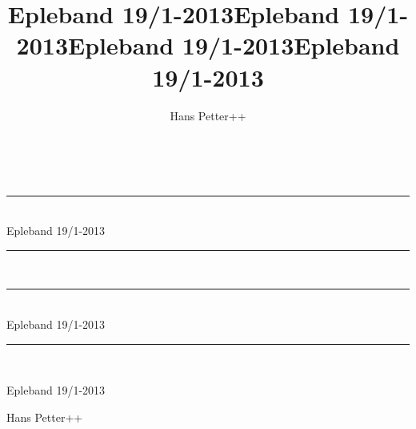\documentclass[%
twoside,                 %
draft,                   %
final,                   %
10pt]{article}
\begin{document}







\title{{\color{seccolor} Epleband 19/1-2013}}
\title{Epleband 19/1-2013}


\thispagestyle{empty}
\hbox{\ \ }
\vfill
\begin{center}
{\huge{\bfseries{
\begin{spacing}{1.25}
{\color{seccolor}\rule{\linewidth}{0.5mm}} \\[0.4cm]
{\color{seccolor}Epleband 19/1-2013}
\\[0.4cm] {\color{seccolor}\rule{\linewidth}{0.5mm}} \\[1.5cm]
{\rule{\linewidth}{0.5mm}} \\[0.4cm]
{Epleband 19/1-2013}
\\[0.4cm] {\rule{\linewidth}{0.5mm}} \\[1.5cm]
\end{spacing}
}}}

\title*{Epleband 19/1-2013}

\title{Epleband 19/1-2013}
\thispagestyle{empty}

\begin{center}
{\LARGE\bf
\begin{spacing}{1.25}
Epleband 19/1-2013
\end{spacing}
}
\end{center}



\author{Hans Petter++}

\vspace{1.3cm}

    {\Large\textsf{Hans Petter++${}^{}$}}\\ [3mm]
    

\end{center}
\end{document}
